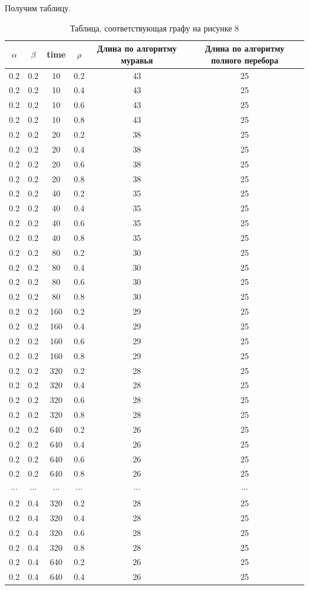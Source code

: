 \documentclass[a4paper,14pt]{article} %
\begin{document}
	Получим таблицу. 
	
\begin{table}[H]
	\caption{Таблица, соответствующая графу на рисунке 8}
\begin{tabular}{|c|c|c|c|c|c|}
		\hline
		$\alpha$&$\beta$&time&$\rho$&Длина по алгоритму муравья&Длина по алгоритму полного перебора \\
		\hline	
0.2&0.2&10&0.2&43&25\\
0.2&0.2&10&0.4&43&25\\
0.2&0.2&10&0.6&43&25\\
0.2&0.2&10&0.8&43&25\\
0.2&0.2&20&0.2&38&25\\
0.2&0.2&20&0.4&38&25\\
0.2&0.2&20&0.6&38&25\\
0.2&0.2&20&0.8&38&25\\
0.2&0.2&40&0.2&35&25\\
0.2&0.2&40&0.4&35&25\\
0.2&0.2&40&0.6&35&25\\
0.2&0.2&40&0.8&35&25\\
0.2&0.2&80&0.2&30&25\\
0.2&0.2&80&0.4&30&25\\
0.2&0.2&80&0.6&30&25\\
0.2&0.2&80&0.8&30&25\\
0.2&0.2&160&0.2&29&25\\
0.2&0.2&160&0.4&29&25\\
0.2&0.2&160&0.6&29&25\\
0.2&0.2&160&0.8&29&25\\
0.2&0.2&320&0.2&28&25\\
0.2&0.2&320&0.4&28&25\\
0.2&0.2&320&0.6&28&25\\
0.2&0.2&320&0.8&28&25\\
0.2&0.2&640&0.2&26&25\\
0.2&0.2&640&0.4&26&25\\
0.2&0.2&640&0.6&26&25\\
0.2&0.2&640&0.8&26&25\\
$\cdots$&$\cdots$&$\cdots$&$\cdots$&$\cdots$&$\cdots$\\
0.2&0.4&320&0.2&28&25\\
0.2&0.4&320&0.4&28&25\\
0.2&0.4&320&0.6&28&25\\
0.2&0.4&320&0.8&28&25\\
0.2&0.4&640&0.2&26&25\\
0.2&0.4&640&0.4&26&25\\

\end{tabular}
\end{table}
\end{document}
